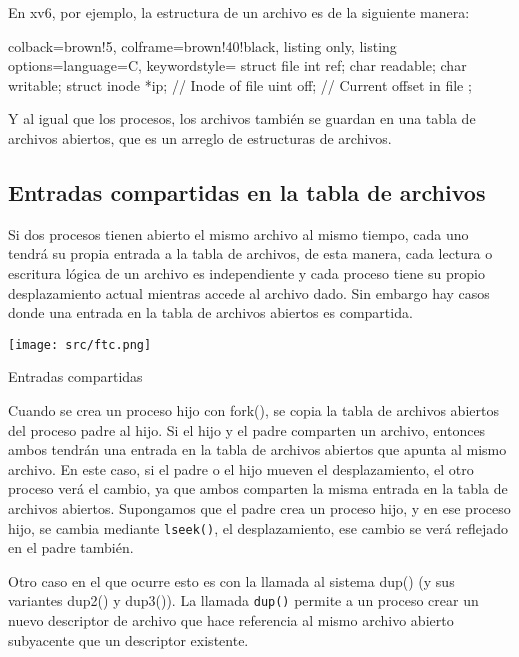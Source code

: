 \documentclass[openany]{book}
\begin{document}
En xv6, por ejemplo, la estructura de un archivo es de la siguiente manera:
\begin{tcblisting}{colback=brown!5, colframe=brown!40!black, listing only, listing options={language=C, keywordstyle=\color{blue!35!white}\bfseries}}
struct file {
    int ref;
    char readable;
    char writable;     
    struct inode *ip;  // Inode of file
    uint off;          // Current offset in file
};
\end{tcblisting}    
Y al igual que los procesos, los archivos también se guardan en una tabla de archivos abiertos, que es un arreglo de estructuras de archivos.

\subsection{Entradas compartidas en la tabla de archivos}

Si dos procesos tienen abierto el mismo archivo al mismo tiempo, \colorbox{yellow!20}{cada uno} tendrá su \colorbox{yellow!20}{propia entrada} a la tabla de archivos, de esta manera, cada lectura o escritura lógica de un archivo es independiente y cada proceso \colorbox{yellow!20}{tiene su propio desplazamiento} actual mientras accede al archivo dado. Sin embargo hay casos donde una entrada en la tabla de archivos abiertos es compartida. 
\newpage
\begin{floatingfigure}[r]{0.4\textwidth}
    \texttt{[image: src/ftc.png]}
    \caption{Entradas compartidas}
\end{floatingfigure}

Cuando se crea un proceso hijo con \colorbox{yellow!20}{fork()}, se copia la tabla de archivos abiertos del proceso padre al hijo. Si el hijo y el padre comparten un archivo, entonces \colorbox{yellow!20}{ambos tendrán una entrada} en la tabla de archivos abiertos que apunta al mismo archivo. En este caso, si el padre o el hijo mueven el desplazamiento, el otro proceso verá el cambio, ya que ambos comparten la misma entrada en la tabla de archivos abiertos. Supongamos que el padre crea un proceso hijo, y en ese proceso hijo, se cambia mediante \texttt{lseek()}, el desplazamiento, ese cambio se verá reflejado en el padre también.

Otro caso en el que ocurre esto es con la llamada al sistema \colorbox{yellow!20}{dup()} (y sus variantes dup2() y dup3()). La llamada \texttt{dup()} permite a un proceso crear un nuevo descriptor de archivo que hace referencia al mismo archivo abierto subyacente que un descriptor existente. 
\end{document}
